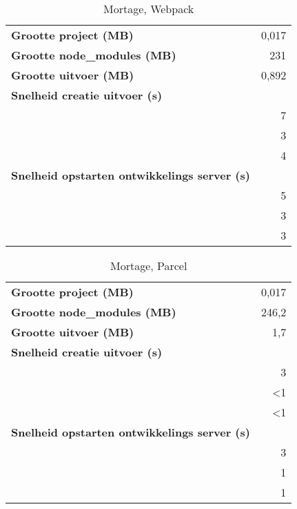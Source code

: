 \begin{table}[h]
    \centering
    \begin{tabular}{lr}
    \textbf{Grootte project (MB)} & 0,017 \\
    \textbf{Grootte node\_modules (MB)} & 231 \\
    \textbf{Grootte uitvoer (MB)} & 0,892 \\
    \textbf{Snelheid creatie uitvoer (s)} & \\
    \textbf{} & 7 \\
    \textbf{} & 3 \\
    \textbf{} & 4 \\
    \textbf{Snelheid opstarten ontwikkelings server (s)} & \\
    \textbf{} & 5 \\
    \textbf{} & 3 \\
    \textbf{} & 3
    \end{tabular}
    \caption{Mortage, Webpack}
    \end{table}

    \begin{table}[h]
        \centering
        \begin{tabular}{lr}
        \textbf{Grootte project (MB)} & 0,017 \\
        \textbf{Grootte node\_modules (MB)} & 246,2 \\
        \textbf{Grootte uitvoer (MB)} & 1,7 \\
        \textbf{Snelheid creatie uitvoer (s)} & \\
        \textbf{} & 3 \\
        \textbf{} & <1 \\
        \textbf{} & <1 \\
        \textbf{Snelheid opstarten ontwikkelings server (s)} & \\
        \textbf{} & 3 \\
        \textbf{} & 1 \\
        \textbf{} & 1
        \end{tabular}
        \caption{Mortage, Parcel}
        \end{table}

